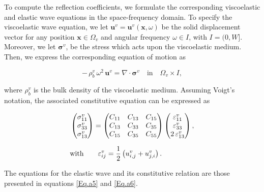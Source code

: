 \documentclass[draft]{agujournal2019}
\begin{document}
To compute the reflection coefficients, we formulate the corresponding viscoelastic and elastic wave equations in the space-frequency domain. To specify the viscoelastic wave equation,  we let $\bm{u}^v =\bm{u}^v( \bm{x}, \omega)$  be the solid displacement vector for any position $\bm{x} \in \Omega_v$  and angular frequency $\omega \in I$, with $I =(0,W]$. Moreover, we let $\bm {\sigma}^v$, be the stress which acts upon the viscoelastic medium. Then, we express the corresponding equation of motion as
\begin{linenomath*}
\begin{equation}\label{Eq.b1}
- \, \rho_b^v \,\omega^2 \, \bm{u}^v = \nabla  \cdot \bm{\sigma}^v \quad  \textrm{in} \quad \Omega_v \times I, 
\end{equation}
\end{linenomath*}
where $\rho_b^v$ is the bulk density of the viscoelastic medium.
Assuming Voigt's notation, the associated constitutive equation can be expressed as
\begin{linenomath*}
\begin{equation}\label{Eq.b2}
\setlength{\jot}{10pt}
\begin{split}
 &
 \begin{pmatrix}
 \sigma_{11}^v\\
 \sigma_{33}^v \\
  \sigma_{13}^v\\
 \end{pmatrix}
 =
   \begin{pmatrix}
  {C}_{11} & {C}_{13} & {C}_{15} \\
  {C}_{13} & {C}_{33} & {C}_{35} \\
  {C}_{15} & {C}_{35} & {C}_{55}\\
 \end{pmatrix}
  \begin{pmatrix}
  \varepsilon_{11}^v \\
  \varepsilon_{33}^v  \\
 2\,  \varepsilon_{13}^v \\
 \end{pmatrix},\\
 & \text{with} \qquad \varepsilon_{ij}^v =\frac{1}{2} \left(u_{i,j}^v + u_{j,i}^v\right).
 \end{split}
\end{equation}
\end{linenomath*}

The equations for the elastic wave and its constitutive relation are those presented in equations \eqref{Eq.a5} and \eqref{Eq.a6}.
\end{document}
